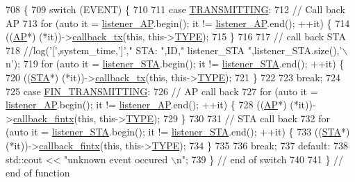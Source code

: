 \begin{DoxyCode}
708                                    \{
709     \textcolor{keywordflow}{switch} (EVENT) \{
710 
711     \textcolor{keywordflow}{case} \hyperlink{common_8h_a3d8f1d48238737396cad8ac23238d226}{TRANSMITTING}:
712         \textcolor{comment}{// Call back AP}
713         \textcolor{keywordflow}{for} (\textcolor{keyword}{auto} it = \hyperlink{classSTA_ad1ed3b95cc0693485be77e8910253ea1}{listener\_AP}.begin(); it != \hyperlink{classSTA_ad1ed3b95cc0693485be77e8910253ea1}{listener\_AP}.end(); ++it) \{
714             ((\hyperlink{classAP}{AP}*) (*it))->\hyperlink{classSTA_a2d79ddf12904606af510bc19a947874f}{callback\_tx}(\textcolor{keyword}{this}, this->\hyperlink{classSTA_a4ddff6315fc6fa20fd508a24dbe54a7d}{TYPE});
715         \}
716 
717         \textcolor{comment}{// call back STA}
718         \textcolor{comment}{//log('[',system\_time,']'," STA: ",ID," listener\_STA ",listener\_STA.size(),'\(\backslash\)n');}
719         \textcolor{keywordflow}{for} (\textcolor{keyword}{auto} it = \hyperlink{classSTA_aee34ffb68253dca6db2b1f52206a5f3e}{listener\_STA}.begin(); it != \hyperlink{classSTA_aee34ffb68253dca6db2b1f52206a5f3e}{listener\_STA}.end(); ++it) \{
720             ((\hyperlink{classSTA}{STA}*) (*it))->\hyperlink{classSTA_a2d79ddf12904606af510bc19a947874f}{callback\_tx}(\textcolor{keyword}{this}, this->\hyperlink{classSTA_a4ddff6315fc6fa20fd508a24dbe54a7d}{TYPE});
721         \}
722 
723         \textcolor{keywordflow}{break};
724 
725     \textcolor{keywordflow}{case} \hyperlink{common_8h_a3966ef347ddeca5d1fa0f492b134dcff}{FIN\_TRANSMITTING}:
726         \textcolor{comment}{// AP call back}
727         \textcolor{keywordflow}{for} (\textcolor{keyword}{auto} it = \hyperlink{classSTA_ad1ed3b95cc0693485be77e8910253ea1}{listener\_AP}.begin(); it != \hyperlink{classSTA_ad1ed3b95cc0693485be77e8910253ea1}{listener\_AP}.end(); ++it) \{
728             ((\hyperlink{classAP}{AP}*) (*it))->\hyperlink{classSTA_a910a13151ca52c2cf1327e1d321ee5ad}{callback\_fintx}(\textcolor{keyword}{this}, this->\hyperlink{classSTA_a4ddff6315fc6fa20fd508a24dbe54a7d}{TYPE});
729         \}
730 
731         \textcolor{comment}{// STA call back}
732         \textcolor{keywordflow}{for} (\textcolor{keyword}{auto} it = \hyperlink{classSTA_aee34ffb68253dca6db2b1f52206a5f3e}{listener\_STA}.begin(); it != \hyperlink{classSTA_aee34ffb68253dca6db2b1f52206a5f3e}{listener\_STA}.end(); ++it) \{
733             ((\hyperlink{classSTA}{STA}*) (*it))->\hyperlink{classSTA_a910a13151ca52c2cf1327e1d321ee5ad}{callback\_fintx}(\textcolor{keyword}{this}, this->\hyperlink{classSTA_a4ddff6315fc6fa20fd508a24dbe54a7d}{TYPE});
734         \}
735 
736         \textcolor{keywordflow}{break};
737     \textcolor{keywordflow}{default}:
738         std::cout << \textcolor{stringliteral}{"unknown event occured \(\backslash\)n"};
739     \} \textcolor{comment}{// end of switch}
740 
741 \} \textcolor{comment}{// end of function}
\end{DoxyCode}
